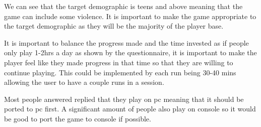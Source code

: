 \documentclass{article}
\newcommand{\parBr}{\vspace{5mm}}%
\begin{document}

We can see that the target demographic is teens and above meaning that the game can include some violence. It is important to make the game appropriate to the target demographic as they will be the majority of the player base. 

\parBr

 \linebreak
{}

It is important to balance the progress made and the time invested as if people only play 1-2hrs a day as shown by the questionnaire, it is important to make the player feel like they made progress in that time so that they are willing to continue playing. This could be implemented by each run being 30-40 mins allowing the user to have a couple runs in a session.

\parBr

 \linebreak
{}

Most people answered replied that they play on pc meaning that it should be ported to pc first. A significant amount of people also play on console so it would be good to port the game to console if possible. 

\parBr

 \linebreak
{}

\parBr
\end{document}
